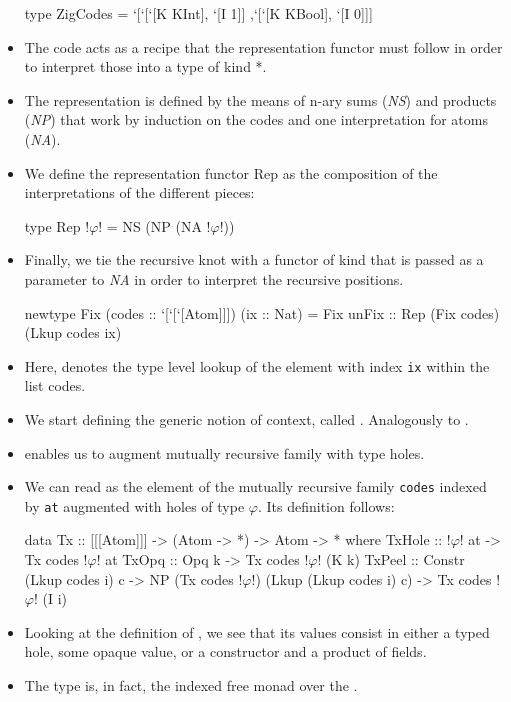 \begin{itemize}
\begin{haskell}
        type ZigCodes = `[`[`[K KInt],  `[I 1]]
                         ,`[`[K KBool], `[I 0]]]
    \end{haskell}
    \item The code acts as a recipe that the representation functor must follow in order to interpret those into a type of kind *.
    \item The representation is defined by the means of n-ary sums (\textit{NS}) and products (\textit{NP}) that work by induction on the codes and one interpretation for atoms (\textit{NA}).
    \item We define the representation functor Rep as the composition of the interpretations of the different pieces:
    \begin{haskell}
        type Rep !$\varphi$! = NS (NP (NA !$\varphi$!))
    \end{haskell}
    \item Finally, we tie the recursive knot with a functor of kind  that is passed as a parameter to \textit{NA} in order to interpret the recursive positions.
    \begin{haskell}
        newtype Fix (codes :: `[`[`[Atom]]]) (ix :: Nat)
            = Fix { unFix :: Rep (Fix codes) (Lkup codes ix) }
    \end{haskell}
    \item Here,  denotes the type level lookup of the element with index \texttt{ix} within the list codes.
    \item We start defining the generic notion of context, called . Analogously to .
    \item {} enables us to augment mutually recursive family with type holes.
    \item We can read  as the element of the mutually recursive family \texttt{codes} indexed by \texttt{at} augmented with holes of type $\varphi$. Its definition follows:
    \begin{haskell}
        data Tx :: [[[Atom]]] -> (Atom -> *) -> Atom -> * where
            TxHole :: !$\varphi$! at -> Tx codes !$\varphi$! at
            TxOpq  :: Opq k -> Tx codes !$\varphi$! (K k)
            TxPeel :: Constr (Lkup codes i) c
                   -> NP (Tx codes !$\varphi$!) (Lkup (Lkup codes i) c)
                   -> Tx codes !$\varphi$! (I i) 
    \end{haskell}
    \item Looking at the definition of , we see that its values consist in either a typed hole, some opaque value, or a constructor and a product of fields.
    \item The  type is, in fact, the indexed free monad over the .
\end{itemize}